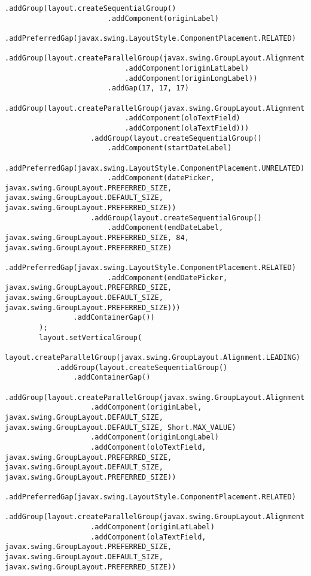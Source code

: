 \begin{lstlisting}[caption= main.java]
                    .addGroup(layout.createSequentialGroup()
                        .addComponent(originLabel)
                        .addPreferredGap(javax.swing.LayoutStyle.ComponentPlacement.RELATED)
                        .addGroup(layout.createParallelGroup(javax.swing.GroupLayout.Alignment.LEADING)
                            .addComponent(originLatLabel)
                            .addComponent(originLongLabel))
                        .addGap(17, 17, 17)
                        .addGroup(layout.createParallelGroup(javax.swing.GroupLayout.Alignment.LEADING)
                            .addComponent(oloTextField)
                            .addComponent(olaTextField)))
                    .addGroup(layout.createSequentialGroup()
                        .addComponent(startDateLabel)
                        .addPreferredGap(javax.swing.LayoutStyle.ComponentPlacement.UNRELATED)
                        .addComponent(datePicker, javax.swing.GroupLayout.PREFERRED_SIZE, javax.swing.GroupLayout.DEFAULT_SIZE, javax.swing.GroupLayout.PREFERRED_SIZE))
                    .addGroup(layout.createSequentialGroup()
                        .addComponent(endDateLabel, javax.swing.GroupLayout.PREFERRED_SIZE, 84, javax.swing.GroupLayout.PREFERRED_SIZE)
                        .addPreferredGap(javax.swing.LayoutStyle.ComponentPlacement.RELATED)
                        .addComponent(endDatePicker, javax.swing.GroupLayout.PREFERRED_SIZE, javax.swing.GroupLayout.DEFAULT_SIZE, javax.swing.GroupLayout.PREFERRED_SIZE)))
                .addContainerGap())
        );
        layout.setVerticalGroup(
            layout.createParallelGroup(javax.swing.GroupLayout.Alignment.LEADING)
            .addGroup(layout.createSequentialGroup()
                .addContainerGap()
                .addGroup(layout.createParallelGroup(javax.swing.GroupLayout.Alignment.BASELINE)
                    .addComponent(originLabel, javax.swing.GroupLayout.DEFAULT_SIZE, javax.swing.GroupLayout.DEFAULT_SIZE, Short.MAX_VALUE)
                    .addComponent(originLongLabel)
                    .addComponent(oloTextField, javax.swing.GroupLayout.PREFERRED_SIZE, javax.swing.GroupLayout.DEFAULT_SIZE, javax.swing.GroupLayout.PREFERRED_SIZE))
                .addPreferredGap(javax.swing.LayoutStyle.ComponentPlacement.RELATED)
                .addGroup(layout.createParallelGroup(javax.swing.GroupLayout.Alignment.BASELINE)
                    .addComponent(originLatLabel)
                    .addComponent(olaTextField, javax.swing.GroupLayout.PREFERRED_SIZE, javax.swing.GroupLayout.DEFAULT_SIZE, javax.swing.GroupLayout.PREFERRED_SIZE))

\end{lstlisting}
